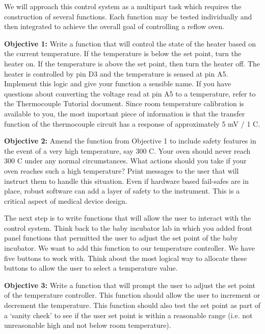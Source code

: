 \documentclass[10pt]{report}
\begin{document}
\par
\indent
We will approach this control system as a multipart task which requires the construction of several functions. Each function may be tested individually and then integrated to achieve the overall goal of controlling a reflow oven.

\par \textbf{Objective 1:} Write a function that will control the state of the heater based on the current temperature. If the temperature is below the set point, turn the heater on. If the temperature is above the set point, then turn the heater off. The heater is controlled by pin D3 and the temperature is sensed at pin A5. Implement this logic and give your function a sensible name. If you have questions about converting the voltage read at pin A5 to a temperature, refer to the Thermocouple Tutorial document. Since room temperature calibration is available to you, the most important piece of information is that the transfer function of the thermocouple circuit has a response of approximately 5 mV / 1 C.

\par \textbf{Objective 2:} Amend the function from Objective 1 to include safety features in the event of a very high temperature, say 300 C. Your oven should never reach 300 C under any normal circumstances. What actions should you take if your oven reaches such a high temperature? Print messages to the user that will instruct them to handle this situation. Even if hardware based fail-safes are in place, robust software can add a layer of safety to the instrument. This is a critical aspect of medical device design.

\par 
\indent
The next step is to write functions that will allow the user to interact with the control system. Think back to the baby incubator lab in which you added front panel functions that permitted the user to adjust the set point of the baby incubator. We want to add this function to our temperature controller. We have five buttons to work with. Think about the most logical way to allocate these buttons to allow the user to select a temperature value.

\par
\textbf{Objective 3:} Write a function that will prompt the user to adjust the set point of the temperature controller. This function should allow the user to increment or decrement the temperature. This function should also test the set point as part of a ‘sanity check’ to see if the user set point is within a reasonable range (i.e. not unreasonable high and not below room temperature).
\end{document}
